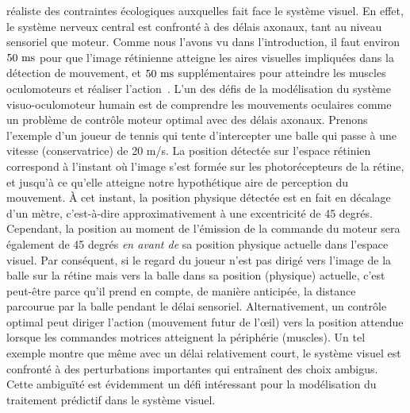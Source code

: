 réaliste des contraintes écologiques auxquelles fait face le système
visuel. En effet, le système nerveux central est confronté à des délais
axonaux, tant au niveau sensoriel que moteur. Comme nous l'avons vu dans
l'introduction, il faut environ $50~\si{\milli\second}$ pour que l'image rétinienne
atteigne les aires visuelles impliquées dans la détection de mouvement,
et $50~\si{\milli\second}$ supplémentaires pour atteindre les muscles oculomoteurs et
réaliser l'action~\citep{Kirchner06}. L'un des défis de la
modélisation du système visuo-oculomoteur humain est de comprendre les
mouvements oculaires comme un problème de contrôle moteur optimal avec
des délais axonaux. Prenons l'exemple d'un joueur de tennis qui tente
d'intercepter une balle qui passe à une vitesse (conservatrice) de 20
m/s. La position détectée sur l'espace rétinien correspond à l'instant
où l'image s'est formée sur les photorécepteurs de la rétine, et jusqu'à
ce qu'elle atteigne notre hypothétique aire de perception du mouvement.
À cet instant, la position physique détectée est en fait en décalage d'un
mètre, c'est-à-dire approximativement à une excentricité de 45 degrés.
Cependant, la position au moment de l'émission de la commande du moteur
sera également de 45 degrés \emph{en avant de} sa position physique
actuelle dans l'espace visuel. Par conséquent, si le regard du joueur
n'est pas dirigé vers l'image de la balle sur la rétine mais vers la
balle dans sa position (physique) actuelle, c'est peut-être parce qu'il
prend en compte, de manière anticipée, la distance parcourue par la
balle pendant le délai sensoriel. Alternativement, un contrôle optimal
peut diriger l'action (mouvement futur de l'œil) vers la position
attendue lorsque les commandes motrices atteignent la périphérie
(muscles). Un tel exemple montre que même avec un délai relativement
court, le système visuel est confronté à des perturbations importantes
qui entraînent des choix ambigus. Cette ambiguïté est évidemment un défi
intéressant pour la modélisation du traitement prédictif dans le système
visuel.

